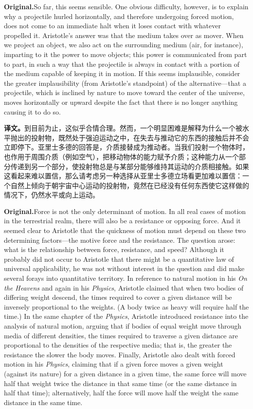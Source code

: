 \documentclass[UTF8]{ctexart}
\newcommand{\orig}{\par\noindent\textbf{Original.}\quad}
\newcommand{\zh}{\par\noindent\textbf{译文。}\quad}
\begin{document}
\orig So far, this seems sensible. One obvious difficulty, however, is to explain why a projectile hurled horizontally, and therefore undergoing forced motion, does not come to an immediate halt when it loses contact with whatever propelled it. Aristotle's answer was that the medium takes over as mover. When we project an object, we also act on the surrounding medium (air, for instance), imparting to it the power to move objects; this power is communicated from part to part, in such a way that the projectile is always in contact with a portion of the medium capable of keeping it in motion. If this seems implausible, consider the greater implausibility (from Aristotle's standpoint) of the alternative---that a projectile, which is inclined by nature to move toward the center of the universe, moves horizontally or upward despite the fact that there is no longer anything causing it to do so.

\zh 到目前为止，这似乎合情合理。然而，一个明显困难是解释为什么一个被水平抛出的投射物，既然处于强迫运动之中，在失去与推动它的东西的接触后并不会立即停下。亚里士多德的回答是，介质接替成为推动者。当我们投射一个物体时，也作用于周围介质（例如空气），把移动物体的能力赋予介质；这种能力从一个部分传递到另一个部分，使投射物总是与某部分能够维持其运动的介质相接触。如果这看起来难以置信，那么请考虑另一种选择从亚里士多德立场看更加难以置信：一个自然上倾向于朝宇宙中心运动的投射物，竟然在已经没有任何东西使它这样做的情况下，仍然水平或向上运动。

\orig Force is not the only determinant of motion. In all real cases of motion in the terrestrial realm, there will also be a resistance or opposing force. And it seemed clear to Aristotle that the quickness of motion must depend on these two determining factors---the motive force and the resistance. The question arose: what is the relationship between force, resistance, and speed? Although it probably did not occur to Aristotle that there might be a quantitative law of universal applicability, he was not without interest in the question and did make several forays into quantitative territory. In reference to natural motion in his \textit{On the Heavens} and again in his \textit{Physics}, Aristotle claimed that when two bodies of differing weight descend, the times required to cover a given distance will be inversely proportional to the weights. (A body twice as heavy will require half the time.) In the same chapter of the \textit{Physics}, Aristotle introduced resistance into the analysis of natural motion, arguing that if bodies of equal weight move through media of different densities, the times required to traverse a given distance are proportional to the densities of the respective media; that is, the greater the resistance the slower the body moves. Finally, Aristotle also dealt with forced motion in his \textit{Physics}, claiming that if a given force moves a given weight (against its nature) for a given distance in a given time, the same force will move half that weight twice the distance in that same time (or the same distance in half that time); alternatively, half the force will move half the weight the same distance in the same time.
\end{document}
